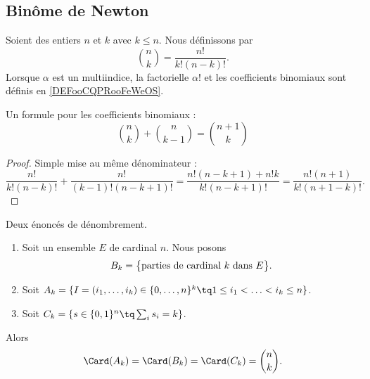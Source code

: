 \subsection{Binôme de Newton}


\begin{definition}		\label{DEFooHXNFooOBKgqD}
	Soient des entiers \( n\) et \( k\) avec \( k\leq n\). Nous définissons  par
	\begin{equation}		\label{EQooJJYGooTvmSAt}
		{n\choose k} = \frac{ n! }{ k!(n-k)! }.
	\end{equation}
	Lorsque \( \alpha\) est un multiindice, la factorielle \( \alpha!\) et les coefficients binomiaux sont définis en \ref{DEFooCQPRooFeWeOS}.
\end{definition}

\begin{lemma}		\label{LEMooHWMNooIINsxu}
	Un formule pour les coefficients binomiaux :
	\begin{equation}
		{n\choose k}+{n\choose k-1}={n+1\choose k}
	\end{equation}
\end{lemma}

\begin{proof}
	Simple mise au même dénominateur :
	\begin{equation}
		\frac{ n! }{ k!(n-k)! }+\frac{ n! }{ (k-1)!(n-k+1)! }=\frac{ n!(n-k+1)+n!k }{ k!(n-k+1)! }=\frac{ n!(n+1) }{  k!(n+1-k)!  }.
	\end{equation}
\end{proof}

\begin{lemma}		\label{LEMooUTDTooXAmvdF}
	Deux énoncés de dénombrement.
	\begin{enumerate}
		\item
		      Soit un ensemble \( E\) de cardinal \( n\). Nous posons
		      \begin{equation}
			      B_k  =\big\{ \text{parties de cardinal \( k\) dans \( E\)} \big\}.
		      \end{equation}
		\item
		      Soit \(  A_k  =\{ I=(i_1,\ldots,i_k)\in\{ 0,\ldots,n \}^k\tq 1\leq i_1<\ldots <i_k\leq n \}\).
		\item
		      Soit \( C_k=\{ s\in\{ 0,1 \}^n\tq \sum_is_i=k \}\).
	\end{enumerate}
	Alors
	\begin{equation}
		\Card(A_k)=\Card(B_k)=\Card(C_k)={n\choose k}.
	\end{equation}
\end{lemma}

